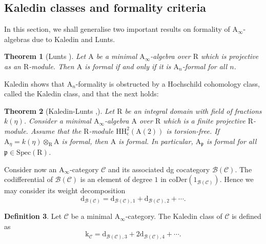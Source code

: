 \documentclass{article}
\theoremstyle{plain}
\newtheorem{theorem}{Theorem}[subsection]   %
\theoremstyle{definition}
\newtheorem{definition}[theorem]{Definition}
\theoremstyle{remark}
\newcommand{\mr}{\mathrm}
\newcommand{\Aa}{\mr{A}_{\infty}}
\newcommand{\3}{\vspace{3mm}}
\newcommand{\2}{\vspace{2mm}}
\newcommand{\1}{\vspace{1mm}}
\begin{document}
\subsection{Kaledin classes and formality criteria}
In this section, we shall generalise two important results on formality of $\Aa$-algebras due to Kaledin and Lunts. 
\2
\begin{theorem}[Lunts \cite{MR2578584}]
 Let $\mr{A}$ be a minimal $\Aa$-algebra over $\mr{R}$ which is projective as an $\mr{R}$-module. Then $\mr{A}$ is formal if and only if it is $\mr{A}_n$-formal for all $n$.
\end{theorem}
Kaledin \cite{MR2372207} shows that $\mr{A}_n$-formality is obstructed by a Hochschild cohomology class, called the Kaledin class, and that the next holds: 
\2
\begin{theorem}[Kaledin-Lunts \cite{MR2372207},\cite{MR2578584}]\label{formalityalg}
 Let $\mr{R}$ be an integral domain with field of fractions $k(\eta)$. Consider a minimal $\Aa$-algebra $\mr{A}$ over $\mr{R}$ which is a finite projective $\mr{R}$-module. Assume that the $\mr{R}$-module $\mr{HH}^{2}_{\mr{c}}(\mr{A}(2))$ is torsion-free. If $\mr{A}_\eta = k(\eta) \otimes_{\mr{R}} \mr{A}$ is formal, then $\mr{A}$ is formal. In particular, $\mr{A}_{\mathfrak{p}}$ is formal for all $\mathfrak{p} \in \mr{Spec(R)}$.
\end{theorem}
Consider now an $\Aa$-category $\mathcal{C}$ and its associated dg cocategory $\mathcal{B}(\mathcal{C})$. The codifferential of $\mathcal{B}(\mathcal{C})$ is an element of degree $1$ in $\mr{coDer}\left(1_{\mathcal{B}(\mathcal{C})}\right)$. Hence we may consider its weight decomposition $$\mr{d}_{\mathcal{B}(\mathcal{C})} = \mr{d}_{\mathcal{B}(\mathcal{C}),1}+\mr{d}_{\mathcal{B}(\mathcal{C}),2}+\cdots.$$
\begin{definition}
Let $\mathcal{C}$ be a minimal $\Aa$-category. The Kaledin class of $\mathcal{C}$ is defined as $$\mr{k}_\mathcal{C}=\mr{d}_{\mathcal{B}(\mathcal{C}),3}+2\mr{d}_{\mathcal{B}(\mathcal{C}),4}+\cdots.$$
\end{definition}
\end{document}
